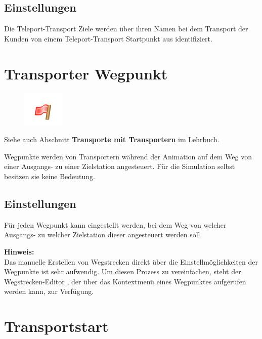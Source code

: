 \subsection*{Einstellungen}

Die Teleport-Transport Ziele werden über ihren Namen bei dem Transport der Kunden von
einem Teleport-Transport Startpunkt aus identifiziert.


\section{Transporter Wegpunkt}
\label{ref:ModelElementWayPoint}

\begin{figure}
\vspace{-22pt}
\includegraphics[width=2cm]{imageModelElementWayPoint.png}
\vspace{-22pt}
\end{figure}

Siehe auch Abschnitt \textbf{Transporte mit Transportern} im Lehrbuch.

Wegpunkte werden von Transportern während der Animation auf dem Weg von einer Ausgangs-
zu einer Zielstation angesteuert. Für die Simulation selbst besitzen sie keine Bedeutung.

\subsection*{Einstellungen}

Für jeden Wegpunkt kann eingestellt werden, bei dem Weg von welcher Ausgangs- zu welcher
Zielstation dieser angesteuert werden soll.

\textbf{Hinweis:}~\\
Das manuelle Erstellen von Wegstrecken direkt über die Einstellmöglichkeiten der
Wegpunkte ist sehr aufwendig. Um diesen Prozess zu vereinfachen, steht der
Wegstrecken-Editor , der über das Kontextmenü
eines Wegpunktes aufgerufen werden kann, zur Verfügung.


\section{Transportstart}
\label{ref:ModelElementTransportSource}

